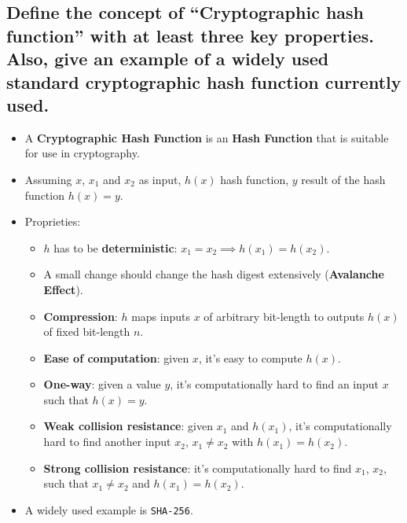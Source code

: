 \documentclass[9pt, letterpaper]{article}
\begin{document}
\subsection{Define the concept of “Cryptographic hash function” with at least three key properties. Also, give an example of a widely used standard cryptographic hash function currently used.}
\begin{itemize}
	\item A \textbf{Cryptographic Hash Function} is an \textbf{Hash Function} that is suitable for use in cryptography.
	\item Assuming $x$, $x_1$ and $x_2$ as input, $h(x)$ hash function, $y$ result of the hash function $h(x)=y$.
	\item Proprieties:
	      \begin{itemize}
		      \item $h$ has to be \textbf{deterministic}: $x_1=x_2 \implies h(x_1)=h(x_2)$.
		      \item A small change should change the hash digest extensively (\textbf{Avalanche Effect}).
		      \item \textbf{Compression}: $h$ maps inputs $x$ of arbitrary bit-length to outputs $h(x)$ of fixed bit-length $n$.
		      \item \textbf{Ease of computation}: given $x$, it's easy to compute $h(x)$.
		      \item \textbf{One-way}: given a value $y$, it's computationally hard to find an input $x$ such that $h(x)=y$.
		      \item \textbf{Weak collision resistance}: given $x_1$ and $h(x_1)$, it's computationally hard to find another input $x_2$, $x_1\ne x_2$ with $h(x_1)=h(x_2)$.
		      \item \textbf{Strong collision resistance}: it's computationally hard to find $x_1$, $x_2$, such that $x_1\ne x_2$ and $h(x_1)=h(x_2)$.
	      \end{itemize}
	\item A widely used example is {\tt SHA-256}.
\end{itemize}
\end{document}
